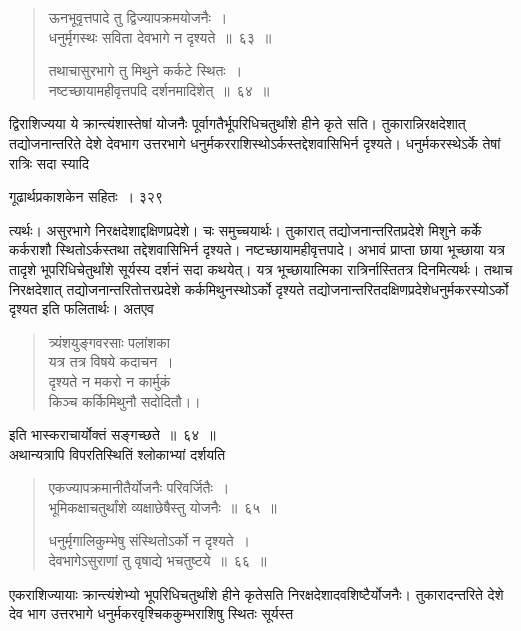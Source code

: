 \documentclass[11pt, openany]{book}
\begin{document}

 \begin{quote}
{\ssi ऊनभूवृत्तपादे तु द्विज्यापक्रमयोजनैः~।\\
धनुर्मृगस्थः सविता देवभागे न दृश्यते~॥~६३~॥ 

तथाचासुरभागे तु मिथुने कर्कटे स्थितः~।\\
नष्टच्छायामहीवृत्तपदि दर्शनमादिशेत्~॥~६४~॥}
\end{quote}
 द्विराशिज्यया ये क्रान्त्यंशास्तेषां योजनैः पूर्वागतैर्भूपरिधिचतुर्थांशे हीने कृते सति। तुकारान्निरक्षदेशात् तद्योजनान्तरिते देशे देवभाग उत्तरभागे धनुर्मकरराशिस्थोऽर्कस्तद्देशवासिभिर्न दृश्यते। धनुर्मकरस्थेऽर्के तेषां रात्रिः सदा स्यादि \textendash



\newpage


\hspace{3cm} गूढार्थप्रकाशकेन सहितः~। \hfill ३२९
\vspace{2mm}


\noindent त्यर्थः। असुरभागे निरक्षदेशाद्दक्षिणप्रदेशे। चः समुच्चयार्थः। तुकारात् तद्योजनान्तरितप्रदेशे मिशुने कर्के कर्कराशौ स्थितोऽर्कस्तथा तद्देशवासिभिर्न दृश्यते। नष्टच्छायामहीवृत्तपादे। अभावं प्राप्ता छाया भूच्छाया यत्र तादृशे भूपरिधिचेतुर्थांशे सूर्यस्य दर्शनं सदा कथयेत्। यत्र भूच्छायात्मिका रात्रिर्नास्तितत्र दिनमित्यर्थः। तथाच निरक्षदेशात् तद्योजनान्तरितोत्तरप्रदेशे कर्कमिथुनस्थोऽर्को दृश्यते तद्योजनान्तरितदक्षिणप्रदेशेधनुर्मकरस्योऽर्को दृश्यत इति फलितार्थः। अतएव \textendash


\begin{quote}
{\qt त्र्यंशयुङ्गवरसाः पलांशका \\
 यत्र तत्र विषये कदाचन~।\\
दृश्यते न मकरो न कार्मुकं \\
किञ्च कर्किमिथुनौ सदोदितौ।। }
\end{quote}

इति भास्कराचार्योक्तं सङ्गच्छते~॥~६४~॥ \\
\noindent अथान्यत्रापि विपरतिस्थितिं श्लोकाभ्यां दर्शयति \textendash 


 \begin{quote}
{\ssi एकज्यापक्रमानीतैर्योजनैः परिवर्जितैः~।\\
भूमिकक्षाचतुर्थांशे व्यक्षाछेषैस्तु योजनैः~॥~६५~॥

धनुर्मृगालिकुम्भेषु संस्थितोऽर्को न दृश्यते~।\\
देवभागेऽसुराणां तु वृषाद्ये भचतुष्टये~॥~६६~॥}
\end{quote}
 एकराशिज्यायाः क्रान्त्यंशेभ्यो भूपरिधिचतुर्थांशे हीने कृतेसति निरक्षदेशादवशिष्टैर्योजनैः। तुकारादन्तरिते देशे देव भाग उत्तरभागे धनुर्मकरवृश्चिककुम्भराशिषु स्थितः सूर्यस्त \textendash
%
\end{document}
